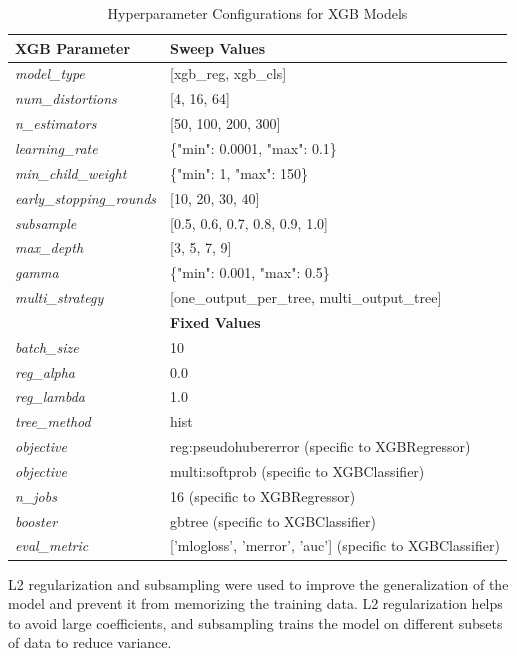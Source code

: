 \begin{table}[h]
    \centering
    \begin{tabular}{|l|l|}
        \hline
        \textbf{XGB Parameter} & \textbf{Sweep Values} \\
        \hline
        \textit{model\_type} & [xgb\_reg, xgb\_cls] \\
        \textit{num\_distortions} & [4, 16, 64] \\
        \textit{n\_estimators} & [50, 100, 200, 300] \\
        \textit{learning\_rate} & \{"min": 0.0001, "max": 0.1\} \\
        \textit{min\_child\_weight} & \{"min": 1, "max": 150\} \\
        \textit{early\_stopping\_rounds} & [10, 20, 30, 40] \\
        \textit{subsample} & [0.5, 0.6, 0.7, 0.8, 0.9, 1.0] \\
        \textit{max\_depth} & [3, 5, 7, 9] \\
        \textit{gamma} & \{"min": 0.001, "max": 0.5\} \\
        \textit{multi\_strategy} & [one\_output\_per\_tree, multi\_output\_tree]\\
        \hline
        \textbf{} & \textbf{Fixed Values} \\
        \hline
        \textit{batch\_size} & 10 \\
        \textit{reg\_alpha} & 0.0 \\
        \textit{reg\_lambda} & 1.0 \\
        \textit{tree\_method} & hist \\
        \textit{objective} & reg:pseudohubererror (specific to XGBRegressor)\\
        \textit{objective} & multi:softprob (specific to XGBClassifier)\\
        \textit{n\_jobs} & 16 (specific to XGBRegressor)\\
        \textit{booster} & gbtree (specific to XGBClassifier)\\
        \textit{eval\_metric} & ['mlogloss', 'merror', 'auc'] (specific to XGBClassifier)\\
        \hline
    \end{tabular}
    \caption{Hyperparameter Configurations for XGB Models}
    \label{table:xgb_hyperparams}
\end{table}
\vspace{\baselineskip}
\noindent
L2 regularization and subsampling were used to improve the generalization of the model and prevent it from memorizing the training data. L2 regularization helps to avoid large coefficients, and subsampling trains the model on different subsets of data to reduce variance. \par


